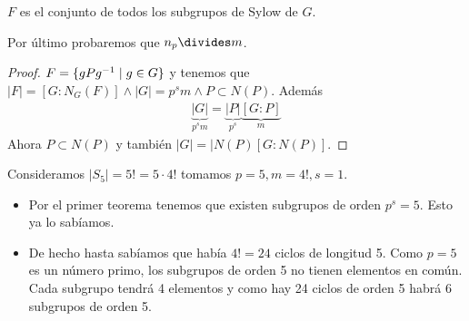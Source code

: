 \begin{cor}
	$F$ es el conjunto de todos los subgrupos de Sylow de $G$.
\end{cor}

\begin{obs}
	Por último probaremos que $n_p \divides m$.
\end{obs}

\begin{proof}
	$F = \{g P g^{-1} \mid g \in G\}$ y tenemos que $|F| = [G:N_G(F)] \land |G| = p^s m \land P \subset N(P)$. Además
	\begin{align*}
		\underbrace{|G|}_{p^sm} = \underbrace{|P|}_{p^s}\underbrace{[G:P]}_{m}
	\end{align*}
	Ahora $P \subset N(P)$ y también $|G| = |N(P)[G:N(P)]$.
\end{proof}

\begin{ej}
	Consideramos $|S_5| = 5! = 5\cdot 4!$ tomamos $p = 5, m = 4!, s = 1$.
	\begin{itemize}
		\item Por el primer teorema tenemos que existen subgrupos de orden $p^s = 5$. Esto ya lo sabíamos. 
		\item De hecho hasta sabíamos que había $4! = 24$ ciclos de longitud 5. Como $p = 5$ es un número primo, los subgrupos de orden 5 no tienen elementos en común. Cada subgrupo tendrá 4 elementos y como hay 24 ciclos de orden 5 habrá 6 subgrupos de orden 5.
	\end{itemize}
\end{ej}


